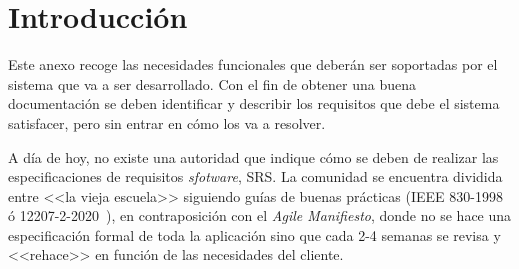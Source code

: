 
\section{Introducción}
Este anexo recoge las necesidades funcionales que deberán ser soportadas por el sistema que va a ser desarrollado. Con el fin de obtener una buena documentación se deben identificar y describir los requisitos que debe el sistema satisfacer, pero sin entrar en cómo los va a resolver.

A día de hoy, no existe una autoridad que indique cómo se deben de realizar las especificaciones de requisitos \textit{sfotware}, SRS. La comunidad se encuentra dividida entre <<la vieja escuela>> siguiendo guías de buenas prácticas (IEEE 830-1998~\cite{720574} ó 12207-2-2020~\cite{IEEE1220722020}), en contraposición con el \textit{Agile Manifiesto}, donde no se hace una especificación formal de toda la aplicación sino que cada 2-4 semanas se revisa y <<rehace>> en función de las necesidades del cliente.

